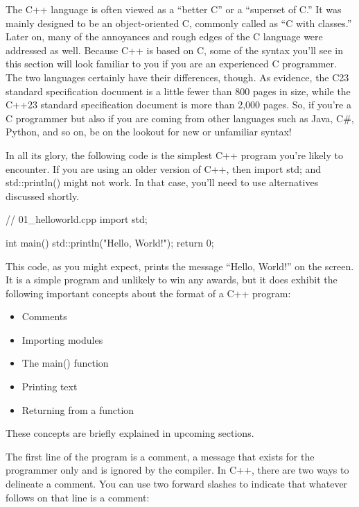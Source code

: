 
The C++ language is often viewed as a “better C” or a “superset of C.” It was mainly designed to be an object-oriented C, commonly called as “C with classes.” Later on, many of the annoyances and rough edges of the C language were addressed as well. Because C++ is based on C, some of the syntax you’ll see in this section will look familiar to you if you are an experienced C programmer. The two languages certainly have their differences, though. As evidence, the C23 standard specification document is a little fewer than 800 pages in size, while the C++23 standard specification document is more than 2,000 pages. So, if you’re a C programmer but also if you are coming from other languages such as Java, C\#, Python, and so on, be on the lookout for new or unfamiliar syntax!


In all its glory, the following code is the simplest C++ program you’re likely to encounter. If you are using an older version of C++, then import std; and std::println() might not work. In that case, you’ll need to use alternatives discussed shortly.

\begin{cpp}
// 01_helloworld.cpp
import std;

int main()
{
    std::println("Hello, World!");
    return 0;
}
\end{cpp}

This code, as you might expect, prints the message “Hello, World!” on the screen. It is a simple program and unlikely to win any awards, but it does exhibit the following important concepts about the format of a C++ program:

\begin{itemize}
\item
Comments

\item
Importing modules

\item
The main() function

\item
Printing text

\item
Returning from a function
\end{itemize}

These concepts are briefly explained in upcoming sections.


The first line of the program is a comment, a message that exists for the programmer only and is ignored by the compiler. In C++, there are two ways to delineate a comment. You can use two forward slashes to indicate that whatever follows on that line is a comment:

